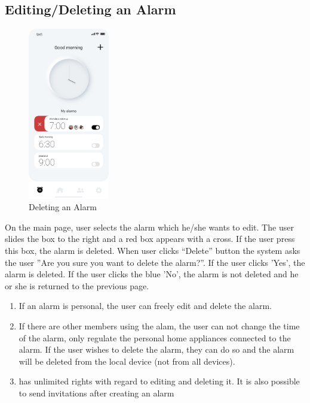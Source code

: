 \documentclass[conference]{IEEEtran}
\begin{document}
\subsection{Editing/Deleting an Alarm}
\begin{figure}[htbp]
    \centerline{\includegraphics[height=75mm,scale=0.5]{Images/DeletingAlarm.png}}
    \caption{Deleting an Alarm}
    \label{fig}
\end{figure}

On the main page, user selects the alarm which he/she wants to edit.  The user slides the box to the right and a red box appears with a cross. If the user press this box, the alarm is deleted.  When user clicks “Delete” button the system asks the user ”Are you sure you want to delete the alarm?”.  If the user clicks ’Yes’, the alarm is deleted. If the user clicks the blue ’No’, the alarm is not deleted and he or she is returned to the previous page.

\begin{enumerate}
    \item If an alarm is personal, the user can freely edit and delete the alarm. 
    \item If there are other members using the alam, the user can not change the time of the alarm, only regulate the personal home appliances connected to the alarm. If the user wishes to delete the alarm, they can do so and the alarm will be deleted from the local device (not from all devices). 
    \item has unlimited rights with regard to editing and deleting it. It is also possible to send invitations after creating an alarm
\end{enumerate}
\end{document}
